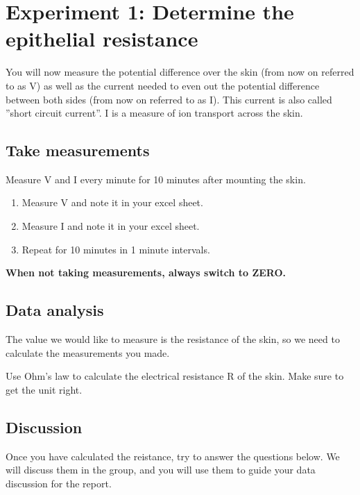\documentclass[
]{book}
\begin{document}
\chapter{Experiment 1: Determine the epithelial resistance}\label{experiment-1-determine-the-epithelial-resistance}

You will now measure the potential difference over the skin (from now on referred to as V) as well as the current needed to even out the potential difference between both sides (from now on referred to as I). This current is also called ''short circuit current''. I is a measure of ion transport across the skin.

\section{Take measurements}\label{take-measurements}

Measure V and I every minute for 10 minutes after mounting the skin.

\begin{enumerate}
\def\labelenumi{\arabic{enumi}.}
\item
  Measure V and note it in your excel sheet.
\item
  Measure I and note it in your excel sheet.
\item
  Repeat for 10 minutes in 1 minute intervals.
\end{enumerate}

\textbf{When not taking measurements, always switch to ZERO.}

\section{Data analysis}\label{data-analysis}

The value we would like to measure is the resistance of the skin, so we need to calculate the measurements you made.

Use Ohm's law to calculate the electrical resistance R of the skin. Make sure to get the unit right.

\section{Discussion}\label{discussion}

Once you have calculated the reistance, try to answer the questions below. We will discuss them in the group, and you will use them to guide your data discussion for the report.
\end{document}
